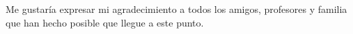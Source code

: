 
\pagestyle{empty}

Me gustaría expresar mi agradecimiento a todos los amigos, profesores y familia que han hecho posible que llegue a este punto.
